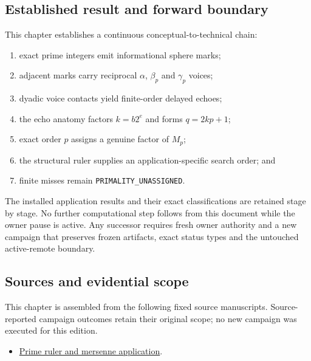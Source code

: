 \subsection{Established result and forward
boundary}\label{viii-ch10-established-result-and-forward-boundary}

This chapter establishes a continuous conceptual-to-technical chain:

\begin{enumerate}
\def\labelenumi{\arabic{enumi}.}
\tightlist
\item
  exact prime integers emit informational sphere marks;
\item
  adjacent marks carry reciprocal \(\alpha\), \(\beta_p\) and
  \(\gamma_p\) voices;
\item
  dyadic voice contacts yield finite-order delayed echoes;
\item
  the echo anatomy factors \(k=b2^e\) and forms \(q=2kp+1\);
\item
  exact order \(p\) assigns a genuine factor of \(M_p\);
\item
  the structural ruler supplies an application-specific search order;
  and
\item
  finite misses remain \texttt{PRIMALITY\_UNASSIGNED}.
\end{enumerate}

The installed application results and their exact classifications are
retained stage by stage. No further computational step follows from this
document while the owner pause is active. Any successor requires fresh
owner authority and a new campaign that preserves frozen artifacts,
exact status types and the untouched active-remote boundary.

\subsection{Sources and evidential
scope}\label{viii-ch10-sources-and-evidential-scope}

This chapter is assembled from the following fixed source manuscripts.
Source-reported campaign outcomes retain their original scope; no new
campaign was executed for this edition.

\begin{itemize}
\tightlist
\item
  \href{https://github.com/iwtbotiwtwot/SAMA/blob/4c2b5dc1649da5900c90b90d0ce56c223dbb7717/vol_iii/05-primes-and-jacobians/prime-ruler-and-mersenne-application.md}{Prime
  ruler and mersenne application}.
\end{itemize}

